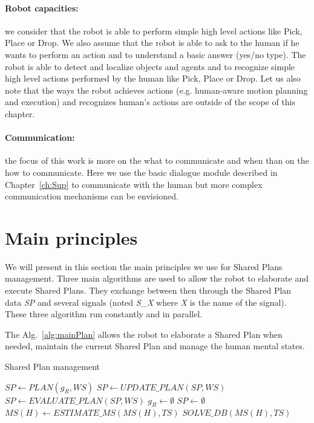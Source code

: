 \documentclass[english,a4paper,11pt,twoside]{StyleThese}
\begin{document}
\paragraph{Robot capacities:} we consider that the robot is able to perform simple high level actions like Pick, Place or Drop. We also assume that the robot is able to ask to the human if he wants to perform an action and to understand a basic answer (yes/no type). 
The robot is able to detect and localize objects and agents
and to recognize simple high level actions performed by the human like Pick, Place or Drop. Let us also note that the ways the robot achieves actions (e.g. human-aware motion planning and execution) and recognizes human's actions are outside of the scope of this chapter.

\paragraph{Communication:} the focus of this work is more on the what to communicate and when than on the how to communicate. Here we use the basic dialogue module described in Chapter~\ref{ch:Sup} to communicate with the human but more complex communication mechanisms can be envisioned. 

\section{Main principles}

We will present in this section the main principles we use for Shared Plans management. Three main algorithms are used to allow the robot to elaborate and execute Shared Plans. They exchange between then through the Shared Plan data \textit{SP} and several signals (noted \textit{S\_X} where \textit{X} is the name of the signal). These three algorithm run constantly and in parallel.

The Alg.~\ref{alg:mainPlan} allows the robot to elaborate a Shared Plan when needed, maintain the current Shared Plan and manage the human mental states.

\begin{algorithm}
\caption{Shared Plan management}
\label{alg:mainPlan}
\begin{algorithmic}
\STATE $SP \leftarrow PLAN(g_R, WS)$
\ENDIF
{}
\STATE $SP \leftarrow UPDATE\_PLAN(SP, WS)$
\ENDIF
{}
\STATE $SP \leftarrow EVALUATE\_ PLAN(SP, WS)$
\ENDIF
{}
\STATE $g_R \leftarrow \emptyset$ 
\STATE $SP \leftarrow \emptyset$
\ENDIF
{}
\STATE $MS(H) \leftarrow ESTIMATE\_MS(MS(H), TS)$
\STATE $SOLVE\_DB(MS(H), TS)$
\ENDIF
\ENDIF
\ENDWHILE
\end{algorithmic}
\end{algorithm} 
\end{document}
